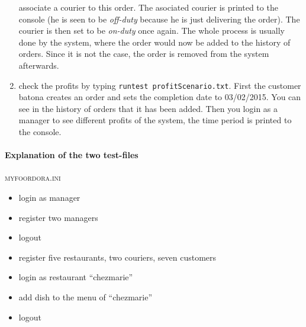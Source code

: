 \begin{enumerate}[itemsep=0mm]
		associate a courier to this order. The asociated courier is printed to the console 
		(he is seen to be \textit{off-duty} because he is just delivering the order). 
		The courier is then set to be \textit{on-duty} once again. The whole process is 
		usually done by the system, where the order would now be added to the history of 
		orders. Since it is not the case, the order is removed from the system afterwards.
	\item check the profits by typing \lstinline|runtest profitScenario.txt|. First the customer
		batona creates an order and sets the completion date to \textsc{03/02/2015}. You can 
		see in the history of orders that it has been added. Then you login as a manager to 
		see different profits of the system, the time period is printed to the console.
	
	
		
\end{enumerate}

\paragraph{Explanation of the two test-files}
\label{par:explanation_of_the_two_test_files}

\textsc{my\textunderscore foordora.ini}
\begin{itemize}[itemsep=0mm]
	\item login as manager
	\item register two managers
	\item logout
	\item register five restaurants, two couriers, seven customers
	\item login as restaurant ``chezmarie''
	\item add dish to the menu of ``chezmarie''
	\item logout
\end{itemize}

